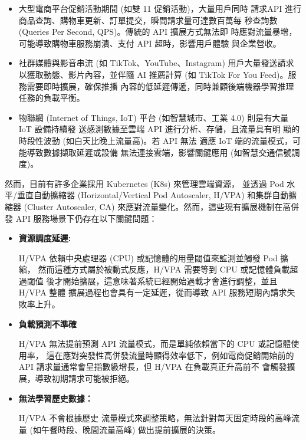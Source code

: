 \documentclass[12pt,a4paper]{article}
\begin{document}
\begin{enumerate}[label={(\zhdig*)}, leftmargin=2\parindent, listparindent=\parindent]
\begin{enumerate}[label={(\arabic*)}, leftmargin=\parindent, listparindent=\parindent]
\begin{itemize}[leftmargin=\parindent, listparindent=\parindent]
\item 大型電商平台促銷活動期間 (如雙 11 促銷活動)，大量用戶同時
請求API 進行商品查詢、購物車更新、訂單提交，瞬間請求量可達數百萬每
秒查詢數 (Queries Per Second, QPS)。傳統的 API 擴展方式無法即
時應對流量暴增，可能導致購物車服務崩潰、支付 API 超時，影響用戶體驗
與企業營收。\cite{4}

\item 社群媒體與影音串流 (如 TikTok、YouTube、Instagram)
用戶大量發送請求以獲取動態、影片內容，並伴隨 AI 推薦計算
(如 TikTok For You Feed)。服務需要即時擴展，確保推播
內容的低延遲傳遞，同時兼顧後端機器學習推理任務的負載平衡。\cite{5}

\item 物聯網 (Internet of Things, IoT) 平台
(如智慧城市、工業 4.0) 則是有大量 IoT 設備持續發
送感測數據至雲端 API 進行分析、存儲，且流量具有明
顯的時段性波動 (如白天比晚上流量高)。若 API 無法
適應 IoT 端的流量模式，可能導致數據擷取延遲或設備
無法連接雲端，影響關鍵應用 (如智慧交通信號調度)。\cite{6}

\end{itemize}

然而，目前有許多企業採用 Kubernetes (K8s) 來管理雲端資源，
並透過 Pod 水平/垂直自動擴縮器
(Horizontal/Vertical Pod Autoscaler, H/VPA)
和集群自動擴縮器 (Cluster Autoscaler, CA)
來應對流量變化。然而，這些現有擴展機制在高併發 API
服務場景下仍存在以下關鍵問題\cite{7}：
\begin{itemize}[leftmargin=\parindent, listparindent=\parindent]
    \item\textbf{資源調度延遲:}

H/VPA 依賴中央處理器 (CPU) 或記憶體的用量閾值來監測並觸發 Pod 擴縮，
然而這種方式屬於被動式反應，H/VPA 需要等到 CPU 或記憶體負載超過閾值
後才開始擴展，這意味著系統已經開始過載才會進行調整，並且 H/VPA 整體
擴展過程也會具有一定延遲，從而導致 API 服務短期內請求失敗率上升。

    \item \textbf{
負載預測不準確
}

H/VPA 無法提前預測 API 流量模式，而是單純依賴當下的 CPU 或記憶體使用率，
這在應對突發性高併發流量時顯得效率低下，例如電商促銷開始前的
API 請求量通常會呈指數級增長，但 H/VPA 在負載真正升高前不
會觸發擴展，導致初期請求可能被拒絕。

\item \textbf{無法學習歷史數據：}

H/VPA 不會根據歷史 流量模式來調整策略，無法針對每天固定時段的高峰流量 (如午餐時段、晚間流量高峰)
做出提前擴展的決策。


\end{itemize}
\end{enumerate}
\end{enumerate}
\end{document}
